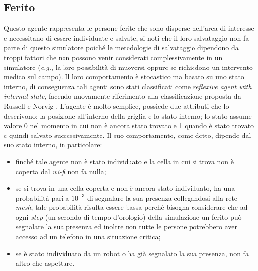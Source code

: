 
\subsection{Ferito}
Questo agente rappresenta le persone ferite che sono disperse nell'area di interesse e necessitano di essere individuate e salvate, si noti che il loro salvataggio non fa parte di questo simulatore poiché le metodologie di salvataggio dipendono da troppi fattori che non possono venir considerati complessivamente in un simulatore (\textit{e.g.}, la loro possibilità di muoversi oppure se richiedono un intervento medico sul campo).
Il loro comportamento è stocastico ma basato su uno stato interno, di conseguenza tali agenti sono stati classificati come \textit{reflexive agent with internal state}, facendo nuovamente riferimento alla classificazione proposta da Russell e Norvig \cite{russell2016}.
L'agente è molto semplice, possiede due attributi che lo descrivono: la posizione all'interno della griglia e lo stato interno; lo stato assume valore 0 nel momento in cui non è ancora stato trovato e 1 quando è stato trovato e quindi salvato successivamente.
Il suo comportamento, come detto, dipende dal suo stato interno, in particolare: 
\begin{itemize}
	\item finché tale agente non è stato individuato e la cella in cui si trova non è coperta dal \textit{wi-fi} non fa nulla;
	\item se si trova in una cella coperta e non è ancora stato individuato, ha una probabilità pari a $10^{-3}$ di segnalare la sua presenza collegandosi alla rete \textit{mesh}, tale probabilità risulta essere bassa perché bisogna considerare che ad ogni \textit{step} (un secondo di tempo d'orologio) della simulazione un ferito può segnalare la sua presenza ed inoltre non tutte le persone potrebbero aver accesso ad un telefono in una situazione critica;
	\item se è stato individuato da un robot o ha già segnalato la sua presenza, non fa altro che aspettare.
\end{itemize}
